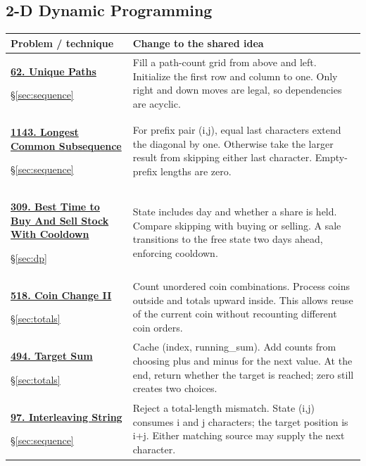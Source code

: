 \documentclass[11pt]{article}
\newcommand{\sect}[1]{\hyperref[sec:#1]{\S\ref*{sec:#1}}}
\begin{document}
\subsection{2-D Dynamic Programming}
\begin{longtable}{@{}L{4.3cm}L{11.7cm}@{}}
\toprule Problem / technique & Change to the shared idea \\ \midrule\endhead
\hypertarget{lc62}{}\href{https://leetcode.com/problems/unique-paths/}{\textbf{62. Unique Paths}}\par\sect{sequence} & Fill a path-count grid from above and left. Initialize the first row and column to one. Only right and down moves are legal, so dependencies are acyclic.\\[4pt]
\hypertarget{lc1143}{}\href{https://leetcode.com/problems/longest-common-subsequence/}{\textbf{1143. Longest Common Subsequence}}\par\sect{sequence} & For prefix pair (i,j), equal last characters extend the diagonal by one. Otherwise take the larger result from skipping either last character. Empty-prefix lengths are zero.\\[4pt]
\hypertarget{lc309}{}\href{https://leetcode.com/problems/best-time-to-buy-and-sell-stock-with-cooldown/}{\textbf{309. Best Time to Buy And Sell Stock With Cooldown}}\par\sect{dp} & State includes day and whether a share is held. Compare skipping with buying or selling. A sale transitions to the free state two days ahead, enforcing cooldown.\\[4pt]
\hypertarget{lc518}{}\href{https://leetcode.com/problems/coin-change-ii/}{\textbf{518. Coin Change II}}\par\sect{totals} & Count unordered coin combinations. Process coins outside and totals upward inside. This allows reuse of the current coin without recounting different coin orders.\\[4pt]
\hypertarget{lc494}{}\href{https://leetcode.com/problems/target-sum/}{\textbf{494. Target Sum}}\par\sect{totals} & Cache (index, running\_sum). Add counts from choosing plus and minus for the next value. At the end, return whether the target is reached; zero still creates two choices.\\[4pt]
\hypertarget{lc97}{}\href{https://leetcode.com/problems/interleaving-string/}{\textbf{97. Interleaving String}}\par\sect{sequence} & Reject a total-length mismatch. State (i,j) consumes i and j characters; the target position is i+j. Either matching source may supply the next character.\\[4pt]

\end{longtable}
\end{document}

